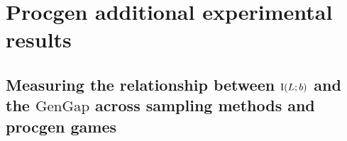 

    
\section{Procgen additional experimental results}\label{c3:app:results_procgen}

\subsection{Measuring the relationship between $\text{I}(L;b)$ and the $\text{GenGap}$ across sampling methods and procgen games}\label{c3:app:mi_gengap}


